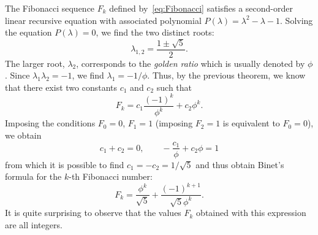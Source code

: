 \begin{example}
%
%
The Fibonacci sequence $F_k$ defined by~\eqref{eq:Fibonacci}
satisfies a second-order linear recursive equation with associated polynomial
$P(\lambda) = \lambda^2 - \lambda - 1$. Solving the equation $P(\lambda)=0$,
we find the two distinct roots:
\[
  \lambda_{1,2} = \frac{1 \pm \sqrt{5}}{2}.
\]
The larger root, $\lambda_2$, corresponds to the
\emph{golden ratio}%
 which is usually denoted by $\phi$.
\index{$\phi$}%
Since $\lambda_1 \lambda_2 = -1$, we find $\lambda_1 = -1/\phi$.
Thus, by the previous theorem, we know that there exist two constants $c_1$ and
$c_2$ such that
\[
  F_k = c_1 \frac{(-1)^k}{\phi^k} + c_2 \phi^k .
\]
Imposing the conditions $F_0=0$, $F_1=1$ (imposing $F_2 = 1$ is equivalent to
$F_0=0$),
we obtain
\[
  c_1 + c_2 = 0, \qquad - \frac{c_1}{\phi} + c_2 \phi  = 1
\]
from which it is possible to find $c_1 = - c_2 = 1/\sqrt{5}$ and thus obtain
Binet's formula for the $k$-th Fibonacci number:
%
%
%
%
%
\[
  F_k = \frac{\phi^k}{\sqrt 5} + \frac{(-1)^{k+1}}{\sqrt 5\phi^k}.
\]
It is quite surprising to observe that the values $F_k$ obtained
with this expression are all integers.
\end{example}